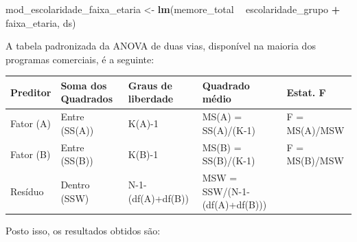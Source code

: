 \documentclass[
]{book}
\newenvironment{Shaded}{\begin{snugshade}}{\end{snugshade}}
\newcommand{\KeywordTok}[1]{\textcolor[rgb]{0.13,0.29,0.53}{\textbf{#1}}}
\newcommand{\NormalTok}[1]{#1}
\newcommand{\OperatorTok}[1]{\textcolor[rgb]{0.81,0.36,0.00}{\textbf{#1}}}
\newcommand{\StringTok}[1]{\textcolor[rgb]{0.31,0.60,0.02}{#1}}
\begin{document}
\begin{Shaded}
\begin{Highlighting}[]
\NormalTok{mod_escolaridade_faixa_etaria <-}\StringTok{ }\KeywordTok{lm}\NormalTok{(memore_total }\OperatorTok{~}\StringTok{ }\NormalTok{escolaridade_grupo }\OperatorTok{+}\StringTok{ }\NormalTok{faixa_etaria, ds)}
\end{Highlighting}
\end{Shaded}

A tabela padronizada da ANOVA de duas vias, disponível na maioria dos programas comerciais, é a seguinte:

\begin{longtable}[]{@{}lllll@{}}
\toprule
Preditor & Soma dos Quadrados & Graus de liberdade & Quadrado médio & Estat. F\tabularnewline
\midrule
\endhead
Fator (A) & Entre (SS(A)) & K(A)-1 & MS(A) = SS(A)/(K-1) & F = MS(A)/MSW\tabularnewline
Fator (B) & Entre (SS(B)) & K(B)-1 & MS(B) = SS(B)/(K-1) & F = MS(B)/MSW\tabularnewline
Resíduo & Dentro (SSW) & N-1-(df(A)+df(B)) & MSW = SSW/(N-1-(df(A)+df(B))) &\tabularnewline
\bottomrule
\end{longtable}

Posto isso, os resultados obtidos são:

\begin{Shaded}
\end{Shaded}
\end{document}
